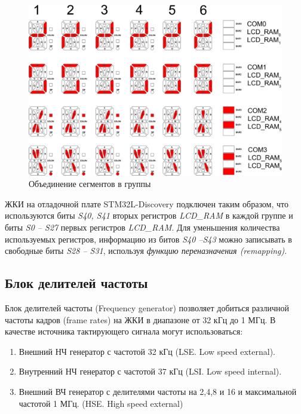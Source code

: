 \begin{figure}[h!]
\begin{center}
\includegraphics[scale=0.33]{Image/27.jpg}
\end{center}
\caption{Объединение сегментов в группы}\label{segment}
\end{figure}

ЖКИ на отладочной плате STM32L-Discovery подключен таким образом, что используются биты  \textit{S40, S41} вторых регистров \textit{LCD\_RAM} в каждой группе и биты  \textit{S0 -- S27} первых регистров \textit{LCD\_RAM}. Для уменьшения количества используемых регистров, информацию из битов  \textit{S40 --S43 }можно записывать в свободные биты  \textit{S28 -- S31}, используя \textit{функцию переназначения (remapping)}. 

\subsection{Блок делителей частоты}

Блок делителей частоты (Frequency generator) позволяет добиться различной частоты кадров (frame rates) на ЖКИ в диапазоне от 32 кГц до 1 МГц. В качестве источника тактирующего сигнала могут использоваться:
\begin{enumerate}
\item Внешний НЧ генератор с частотой 32 кГц (LSE. Low speed external).
\item Внутренний НЧ генератор с частотой 37 кГц (LSI. Low speed internal).
\item Внешний ВЧ генератор с делителями частоты на 2,4,8 и 16 и максимальной частотой 1 МГц. (HSE. High speed external)
\end{enumerate}

